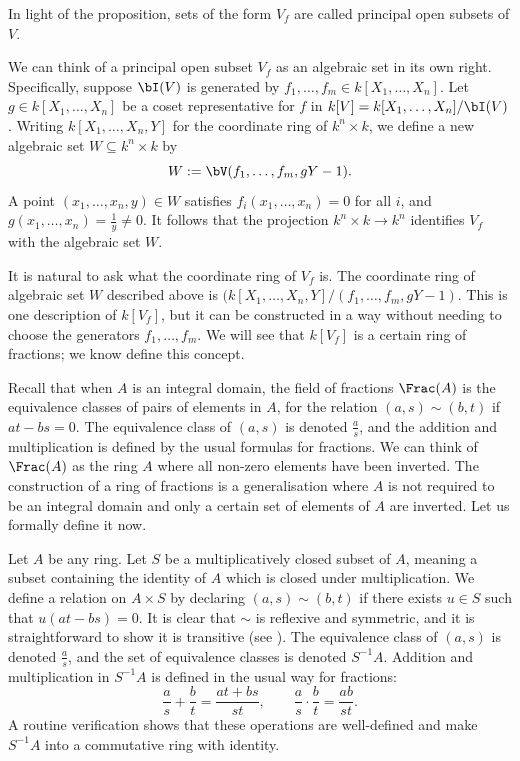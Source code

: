 \documentclass[12pt]{amsart}
\theoremstyle{plain}
\theoremstyle{definition}
\begin{document}
In light of the proposition, sets of the form $V_f$ are called principal open subsets of $V$.

We can think of a principal open subset $V_f$ as an algebraic set in its own right.
Specifically, suppose $\bI(V)$ is generated by $f_1, \ldots, f_m \in k[X_1, \ldots, X_n]$.
Let $g \in k[X_1, \ldots, X_n]$ be a coset representative for $f$ in $k[V] = k[X_1, \ldots, X_n]/\bI(V)$.
Writing $k[X_1, \ldots, X_n, Y]$ for the coordinate ring of $k^n \times k$, we define a new algebraic set $W \subseteq k^n \times k$ by 
$$W:=\bV(f_1, \ldots, f_m, g Y - 1).$$
A point $(x_1, \ldots, x_n, y) \in W$ satisfies $f_i(x_1, \ldots, x_n) = 0$ for all $i$, and  $g(x_1, \ldots, x_n) = \frac{1}{y} \ne 0$.
It follows that the projection $k^n \times k \to k^n$ identifies $V_f$ with the algebraic set $W$.

It is natural to ask what the coordinate ring of $V_f$ is.
The coordinate ring of algebraic set $W$ described above is $(k[X_1,\ldots, X_n,Y]/(f_1, \ldots, f_m, gY-1).$
This is one description  of $k[V_f]$, but it can be constructed in a way without needing to choose the generators $f_1, \ldots, f_m$.
We will see that $k[V_f]$ is a certain ring of fractions; we know define this concept.

Recall that when $A$ is an integral domain, the field of fractions $\Frac(A)$ is the equivalence classes of pairs of elements in $A$, for the relation $(a, s) \sim (b, t)$ if $at-bs=0$.
The equivalence class of $(a,s)$ is denoted $\frac{a}{s}$, and the addition and multiplication is defined by the usual formulas for fractions.
We can think of $\Frac(A)$ as the ring $A$ where all non-zero elements have been inverted.
The construction of a ring of fractions is a generalisation where $A$ is not required to be an integral domain and only a certain set of elements of $A$ are inverted.
Let us formally define it now.

Let $A$ be any ring.
Let $S$ be a multiplicatively closed subset of $A$, meaning a subset containing the identity of $A$ which is closed under multiplication.
We define a relation on $A \times S$ by declaring $(a, s) \sim (b, t)$ if there exists $u \in S$ such that $u(at - bs)=0$.
It is clear that $\sim$ is reflexive and symmetric, and it is straightforward to show it is transitive (see \cite[\S 3]{AM}).
The equivalence class of $(a,s)$ is denoted $\frac{a}{s}$, and the set of equivalence classes is denoted $S^{-1}A$.
Addition and multiplication in $S^{-1}A$ is defined in the usual way for fractions:
$$\frac{a}{s}+\frac{b}{t} = \frac{at+bs}{st}, \qquad \frac{a}{s}\cdot\frac{b}{t} = \frac{ab}{st}.$$
A routine verification shows that these operations are well-defined and make $S^{-1}A$ into a commutative ring with identity.
\end{document}
